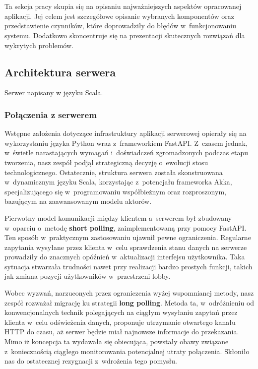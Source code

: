 \chapter{\ChapterTitleRealizationAspects}
\label{sec:wybrane-aspekty-realizacji}

Ta sekcja pracy skupia się na opisaniu najważniejszych aspektów
opracowanej aplikacji.
Jej celem jest szczegółowe opisanie wybranych
komponentów oraz przedstawienie czynników, które doprowadziły do
błędów w~funkcjonowaniu systemu. Dodatkowo skoncentruje
się na prezentacji skutecznych rozwiązań dla wykrytych problemów.

\section{Architektura serwera}
Serwer napisany w języku Scala.






\subsection{Połączenia z serwerem}
Wstępne założenia dotyczące infrastruktury aplikacji
serwerowej opierały się na wykorzystaniu języka Python
wraz z~frameworkiem FastAPI. Z~czasem jednak, w~świetle
narastających wymagań i~doświadczeń zgromadzonych
podczas etapu tworzenia, nasz zespół podjął
strategiczną decyzję o~ewolucji stosu technologicznego.
Ostatecznie, struktura serwera została skonstruowana
w~dynamicznym języku Scala, korzystając z~potencjału
frameworka Akka, specjalizującego się w~programowaniu
współbieżnym oraz rozproszonym, bazującym na
zaawansowanym modelu aktorów.

Pierwotny model komunikacji między klientem a~serwerem
był zbudowany w~oparciu o~metodę \textbf{short polling},
zaimplementowaną przy pomocy FastAPI. Ten sposób
w~praktycznym zastosowaniu ujawnił pewne ograniczenia.
Regularne zapytania wysyłane przez klienta w~celu
sprawdzenia stanu danych na serwerze prowadziły do
znacznych opóźnień w~aktualizacji interfejsu
użytkownika. Taka sytuacja stwarzała trudności nawet
przy realizacji bardzo prostych funkcji, takich jak
zmiana pozycji użytkowników w~przestrzeni lobby.

Wobec wyzwań, narzuconych przez ograniczenia wyżej wspomnianej metody, nasz
zespół rozważał migrację ku strategii \textbf{long polling}. Metoda ta,
w~odróżnieniu od konwencjonalnych technik polegających na ciągłym
wysyłaniu zapytań przez klienta w~celu odświeżenia danych, proponuje
utrzymanie otwartego kanału HTTP do czasu, aż serwer będzie miał
najnowsze informacje do przekazania. Mimo iż koncepcja ta wydawała się
obiecująca, powstały obawy związane z~koniecznością ciągłego monitorowania
potencjalnej utraty połączenia. Skłoniło nas do ostatecznej rezygnacji
z~wdrożenia tego pomysłu.

